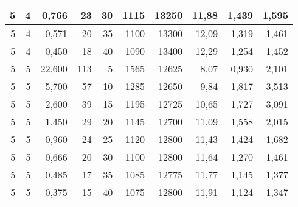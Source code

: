\begin{tabular}{rrrrrrrrrr}
5 & 4 & 0,766 & 23 & 30 & 1115 & 13250 & 11,88 & 1,439 & 1,595 \\ \hline
5 & 4 & 0,571 & 20 & 35 & 1100 & 13300 & 12,09 & 1,319 & 1,461 \\ \hline
5 & 4 & 0,450 & 18 & 40 & 1090 & 13400 & 12,29 & 1,254 & 1,452 \\ \hline
5 & 5 & 22,600 & 113 & 5 & 1565 & 12625 & 8,07 & 0,930 & 2,101 \\ \hline
5 & 5 & 5,700 & 57 & 10 & 1285 & 12650 & 9,84 & 1,817 & 3,513 \\ \hline
5 & 5 & 2,600 & 39 & 15 & 1195 & 12725 & 10,65 & 1,727 & 3,091 \\ \hline
5 & 5 & 1,450 & 29 & 20 & 1145 & 12700 & 11,09 & 1,558 & 2,015 \\ \hline
5 & 5 & 0,960 & 24 & 25 & 1120 & 12800 & 11,43 & 1,424 & 1,682 \\ \hline
5 & 5 & 0,666 & 20 & 30 & 1100 & 12800 & 11,64 & 1,270 & 1,461 \\ \hline
5 & 5 & 0,485 & 17 & 35 & 1085 & 12775 & 11,77 & 1,145 & 1,377 \\ \hline
5 & 5 & 0,375 & 15 & 40 & 1075 & 12800 & 11,91 & 1,124 & 1,347 \\ \hline
\bottomrule
\end{tabular}
